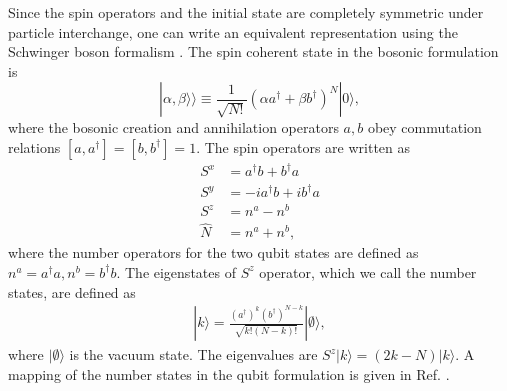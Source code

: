 \documentclass[%
  prx,%
  twocolumn,%
  preprintnumbers,%
  amsmath,%
  amssymb,%
  superscriptaddress%
]{revtex4}
\begin{document}
Since the spin operators and the initial state are completely symmetric under particle interchange, one can write an equivalent representation using the Schwinger boson formalism \cite{byrnes2020quantum}.  The spin coherent state in the bosonic formulation is
%
\begin{equation}
\label{becqubit}
|\alpha,\beta\rangle\rangle\equiv\frac{1}{\sqrt{N!}}(\alpha a^\dagger+\beta b^\dagger)^{N}|0\rangle,
\end{equation}
%
where the bosonic creation and annihilation operators $ a, b $ obey commutation relations $[a,a^\dagger]=[b,b^\dagger]=1$. The spin operators are written as
%
\begin{align}
S^x & = a^\dagger b + b^\dagger a \nonumber \\
S^y & = -i a^\dagger b + i b^\dagger a \nonumber \\
S^z & = n^a - n^b \nonumber \\
\hat{N} & = n^a + n^b ,
\end{align}
%
where the number operators for the two qubit states are defined as $ n^a = a^\dagger a, n^b = b^\dagger b $.  The eigenstates of $ S^z $ operator, which we call the number states, are defined as
%
\begin{align}
| k \rangle = \frac{ (a^\dagger)^k (b^\dagger)^{N-k} }{\sqrt{k! (N-k)!}} | \emptyset \rangle ,
\end{align}
%
where $ | \emptyset \rangle $ is the vacuum state.  The eigenvalues are $ S^z |k \rangle = (2k - N) | k \rangle $. A mapping of the number states in the qubit formulation is given in Ref. \cite{byrnes2023multipartite}.



\end{document}
